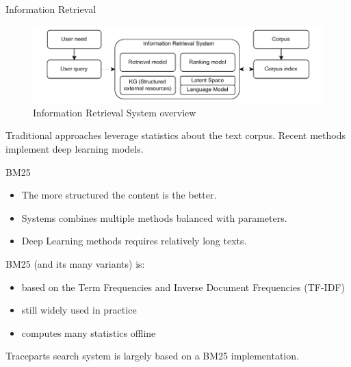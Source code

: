 \begin{frame}{Information Retrieval}
    
    \begin{figure} [H]
        \begin{center}
            \includegraphics[scale=0.8]{images/ir-system-comps.pdf} 
            \caption{Information Retrieval System overview} 
        \end{center}
    \end{figure}

    \begin{center}
        Traditional approaches leverage statistics about the text corpus. Recent methods implement deep learning models.
    \end{center}
    
\end{frame}

\begin{frame}{BM25}

    \begin{itemize}
        \item The more structured the content is the better.
        \item Systems combines multiple methods balanced with parameters.
        \item Deep Learning methods requires relatively long texts.
    \end{itemize}
    
    BM25 (and its many variants) is:
    \begin{itemize}
        \item based on the Term Frequencies and Inverse Document Frequencies (TF-IDF)
        \item still widely used in practice
        \item computes many statistics offline
    \end{itemize}

    \begin{center}
        Traceparts search system is largely based on a BM25 implementation.
    \end{center}
    
\end{frame}

